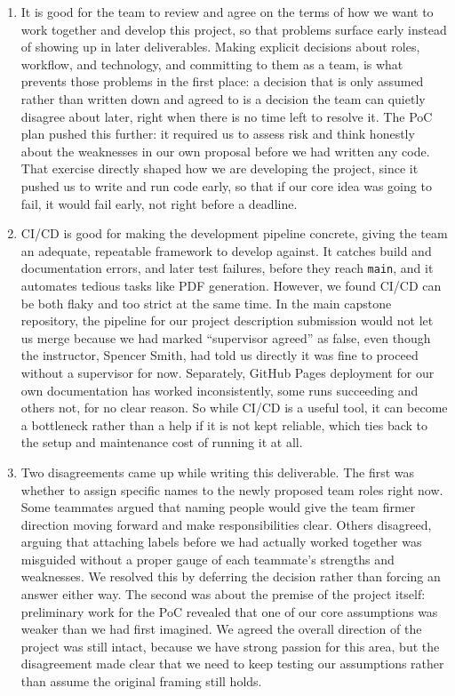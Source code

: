 \documentclass{article}
\begin{document}
\begin{enumerate}
    \item It is good for the team to review and agree on the terms of how
    we want to work together and develop this project, so that problems
    surface early instead of showing up in later deliverables. Making
    explicit decisions about roles, workflow, and technology, and
    committing to them as a team, is what prevents those problems in the
    first place: a decision that is only assumed rather than written down
    and agreed to is a decision the team can quietly disagree about later,
    right when there is no time left to resolve it. The PoC plan pushed
    this further: it required us to assess risk and think honestly about
    the weaknesses in our own proposal before we had written any code.
    That exercise directly shaped how we are developing the project, since
    it pushed us to write and run code early, so that if our core idea was
    going to fail, it would fail early, not right before a deadline.
    \item CI/CD is good for making the development pipeline concrete,
    giving the team an adequate, repeatable framework to develop against.
    It catches build and documentation errors, and later test failures,
    before they reach \texttt{main}, and it automates tedious tasks like
    PDF generation. However, we found CI/CD can be both flaky and too
    strict at the same time. In the main capstone repository, the
    pipeline for our project description submission would not let us
    merge because we had marked ``supervisor agreed'' as false, even
    though the instructor, Spencer Smith, had told us directly it was fine
    to proceed without a supervisor for now. Separately, GitHub Pages
    deployment for our own documentation has worked inconsistently, some
    runs succeeding and others not, for no clear reason. So while CI/CD is
    a useful tool, it can become a bottleneck rather than a help if it is
    not kept reliable, which ties back to the setup and maintenance cost
    of running it at all.
    \item Two disagreements came up while writing this deliverable. The
    first was whether to assign specific names to the newly proposed team
    roles right now. Some teammates argued that naming people would give
    the team firmer direction moving forward and make responsibilities
    clear. Others disagreed, arguing that attaching labels before we had
    actually worked together was misguided without a proper gauge of each
    teammate's strengths and weaknesses. We resolved this by deferring the
    decision rather than forcing an answer either way. The second was
    about the premise of the project itself: preliminary work for the PoC
    revealed that one of our core assumptions was weaker than we had first
    imagined. We agreed the overall direction of the project was still
    intact, because we have strong passion for this area, but the
    disagreement made clear that we need to keep testing our assumptions
    rather than assume the original framing still holds.
\end{enumerate}
\end{document}

